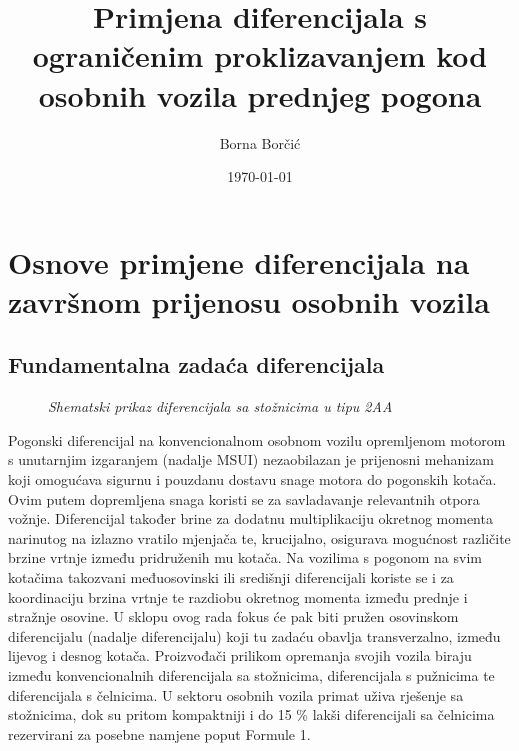 \documentclass[11pt]{article}
\title{Primjena diferencijala s ograničenim proklizavanjem kod osobnih vozila prednjeg pogona}
\author{Borna Borčić}
\date{\today}
\numberwithin{equation}{section}%
\begin{document}
\setlength{\abovedisplayskip}{10pt}%
\setlength{\belowdisplayskip}{10pt}


\newpage
\tableofcontents
\newpage
{}%
\listoffigures
\listoftables
\newpage
\newpage
\setcounter{table}{0}%


\section{Osnove primjene diferencijala na završnom prijenosu osobnih vozila}
	\subsection{Fundamentalna zadaća diferencijala}

\begin{wrapfigure}{r}{0.4\textwidth}
 \centering
 \def\svgwidth{6,8cm}
 
 \caption{\textit{Shematski prikaz diferencijala sa stožnicima u tipu 2AA} \cite{ober}}
 \label{fig:oberica}
\end{wrapfigure} 	
	 
Pogonski diferencijal na konvencionalnom osobnom vozilu opremljenom motorom s unutarnjim izgaranjem (nadalje MSUI) nezaobilazan je prijenosni mehanizam koji omogućava sigurnu i pouzdanu dostavu snage motora do pogonskih kotača. Ovim putem dopremljena snaga koristi se za savladavanje relevantnih otpora vožnje. Diferencijal također brine za dodatnu multiplikaciju okretnog momenta narinutog na izlazno vratilo mjenjača te, krucijalno, osigurava mogućnost različite brzine vrtnje između pridruženih mu kotača. Na vozilima s pogonom na svim kotačima takozvani međuosovinski ili središnji diferencijali koriste se i za koordinaciju brzina vrtnje te razdiobu okretnog momenta između prednje i stražnje osovine. U sklopu ovog rada fokus će pak biti pružen osovinskom diferencijalu (nadalje diferencijalu) koji tu zadaću obavlja transverzalno, između lijevog i desnog kotača. Proizvođači prilikom opremanja svojih vozila biraju između konvencionalnih diferencijala sa stožnicima, diferencijala s pužnicima te diferencijala s čelnicima. U sektoru osobnih vozila primat uživa rješenje sa stožnicima, dok su pritom kompaktniji i do 15 \% lakši diferencijali sa čelnicima rezervirani za posebne namjene poput Formule 1.
\end{document}
